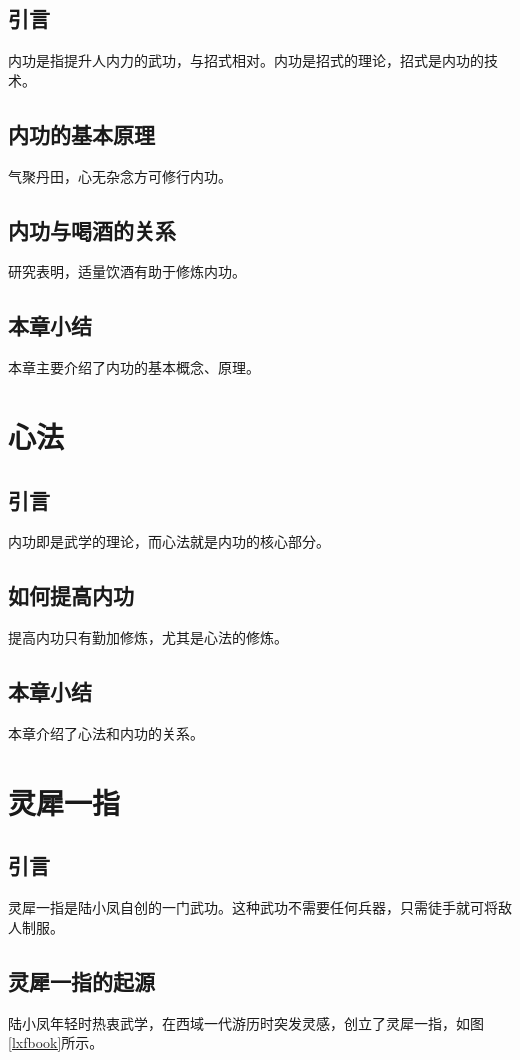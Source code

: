 \documentclass[algorithmlist, figurelist,tablelist, nomlist,masters]{seuthesix}
\begin{document}
\section{引言}
内功是指提升人内力的武功，与招式相对。内功是招式的理论，招式是内功的技术。

\section{内功的基本原理}
气聚丹田，心无杂念方可修行内功。

\section{内功与喝酒的关系}
研究表明，适量饮酒有助于修炼内功。



\section{本章小结}
本章主要介绍了内功的基本概念、原理。

\chapter{心法}
\section{引言}
内功即是武学的理论，而心法就是内功的核心部分。
\section{如何提高内功}
提高内功只有勤加修炼，尤其是心法的修炼。
\section{本章小结}
本章介绍了心法和内功的关系。

\chapter{灵犀一指}
\section{引言}
灵犀一指是陆小凤自创的一门武功。这种武功不需要任何兵器，只需徒手就可将敌人制服。

\section{灵犀一指的起源}
陆小凤年轻时热衷武学，在西域一代游历时突发灵感，创立了灵犀一指，如图\ref{lxfbook}所示。
\end{document}
